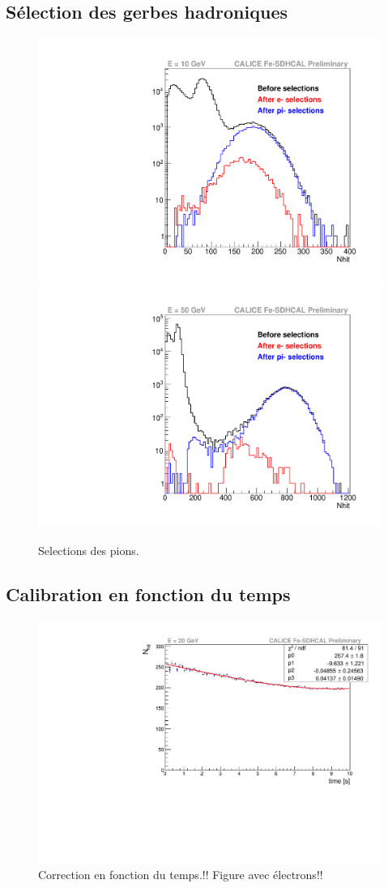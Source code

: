 \subsection{Sélection des gerbes hadroniques}
\label{sec.shower_selection}
\begin{figure}[!h]
  \begin{center}
    \includegraphics[width=.45\textwidth]{SDHCAL/figs/selection715693.pdf}
    \includegraphics[width=.45\textwidth]{SDHCAL/figs/selection715751.pdf}
    \caption{Selections des pions.}
    \label{fig:pion_selection}
  \end{center}
\end{figure}

\subsection{Calibration en fonction du temps}
\label{sec.timeCalib}
\begin{figure}[!h]
  \begin{center}
    \includegraphics[width=.7\textwidth]{SDHCAL/figs/timeFit.pdf}
    \caption{Correction en fonction du temps.!! Figure avec électrons!!}
    \label{fig:time_correction}
  \end{center}
\end{figure}

